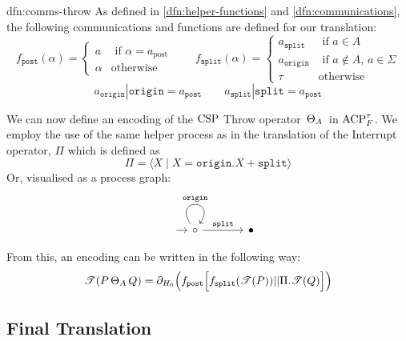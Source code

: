 \documentclass[../hons_project.tex]{subfiles}
\begin{document}
\begin{dfn}{dfn:comms-throw}{}
	As defined in \ref{dfn:helper-functions} and \ref{dfn:communications}, the following communications and functions are defined for our translation:
	\[f_{\mathtt{post}}(\alpha) = \begin{cases}
			a      & \text{ if } \alpha = a_{\mathrm{post}} \\
			\alpha & \text{otherwise}
		\end{cases} \qquad f_{\mathtt{split}}(\alpha) = \begin{cases}
			a_{\mathtt{split}}  & \text{ if } a\in A                    \\
			a_{\mathtt{origin}} & \text{ if } a\not\in A,\, a\in \Sigma \\
			\tau                & \mathrm{otherwise}
		\end{cases}\]
	\[a_{\mathtt{origin}} | \mathtt{origin} = a_{\mathtt{post}} \qquad a_{\mathtt{split}} | \mathtt{split} = a_{\mathtt{post}}\]
\end{dfn}

We can now define an encoding of the $\mathrm{CSP}$ Throw operator $\,\Theta_{A}\,$ in $\mathrm{ACP}_{F}^{\tau}$. We employ the use of the same helper process as in the translation of the Interrupt operator, $\Pi$ which is defined as
\[\Pi = \langle X \mid X = \mathtt{origin}.X + \mathtt{split} \rangle\]
Or, visualised as a process graph:
\[\begin{tikzcd}[column sep=scriptsize, row sep=scriptsize]
		{} & \circ && \bullet
		\arrow[shorten <=8pt, from=1-1, to=1-2]
		\arrow["{\mathtt{origin}}", from=1-2, to=1-2, loop, in=55, out=125, distance=10mm]
		\arrow["{\mathtt{split}}", from=1-2, to=1-4]
	\end{tikzcd}\]

From this, an encoding can be written in the following way:
\[\mathscr{T}(P \,\Theta_{A}\, Q) = \partial_{H_{0}}\Bigl(f_{\mathtt{post}}\Bigl[ f_{\mathtt{split}}(\mathscr{T}(P)) | | \Pi.\mathscr{T}(Q) \Bigr]\Bigr)\]





\newpage
\subsection{Final Translation}
\end{document}
